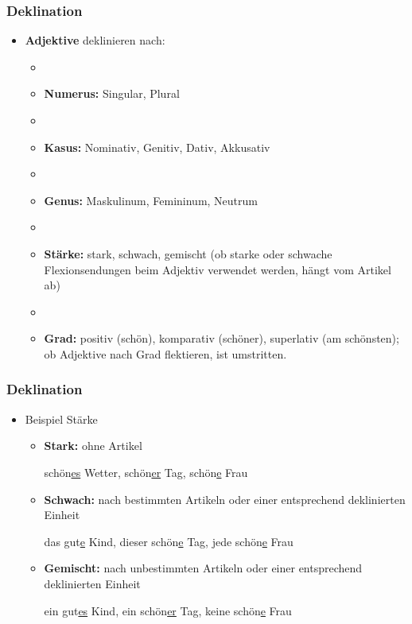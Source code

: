 
\begin{frame}
\frametitle{Deklination}

\begin{itemize}
\item \textbf{Adjektive} deklinieren nach:

\begin{itemize}
\item[]
\item \textbf{Numerus:} Singular, Plural
\item []
\item \textbf{Kasus:} Nominativ, Genitiv, Dativ, Akkusativ
\item[]
\item \textbf{Genus:} Maskulinum, Femininum, Neutrum
\item[]
\item \textbf{Stärke:} stark, schwach, gemischt (ob starke oder schwache Flexionsendungen beim Adjektiv verwendet werden, hängt vom Artikel ab)
\item[]
\item \textbf{Grad:} positiv (schön), komparativ (schöner), superlativ (am schönsten); ob Adjektive nach Grad flektieren, ist umstritten.
\end{itemize}

\end{itemize}


\end{frame}




\begin{frame}
\frametitle{Deklination}

\begin{itemize}
\item Beispiel Stärke

\begin{itemize}
\item \textbf{Stark:} ohne Artikel

\ea schön\underline{es} Wetter, schön\underline{er} Tag, schön\underline{e} Frau
\z

\item \textbf{Schwach:} nach bestimmten Artikeln oder einer entsprechend deklinierten Einheit

\ea das gut\underline{e} Kind, dieser schön\underline{e} Tag, jede schön\underline{e} Frau
\z

\item \textbf{Gemischt:} nach unbestimmten Artikeln oder einer entsprechend deklinierten Einheit

\ea ein gut\underline{es} Kind, ein schön\underline{er} Tag, keine schön\underline{e} Frau
\z

\end{itemize}

\end{itemize}

\end{frame}




